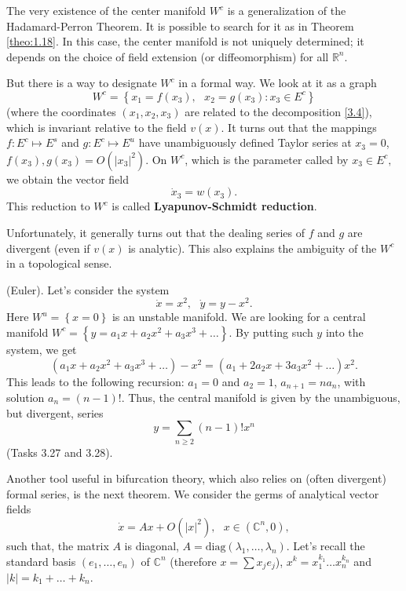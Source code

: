The very existence of the center manifold $W^{c}$ is a generalization of the Hadamard-Perron Theorem. It is possible to search for it as in Theorem \ref{theo:1.18}. In this case, the center manifold is not uniquely determined; it depends on the choice of field extension (or diffeomorphism) for all $\mathbb{R}^n$.

But there is a way to designate $W^c$ in a formal way. We look at it as a graph
$$
W^{c}=\left\{ x_{1}=f(x_{3}),\text{ \ }x_{2}=g(x_{3}):x_{3}\in E^{c}\right\}
$$
(where the coordinates $(x_1, x_2, x_3)$ are related to the decomposition \eqref{3.4}), which is invariant relative to the field $v (x)$. It turns out that the mappings $f:E^{c}\longmapsto E^{s}$ and $g:E^{c}\longmapsto E^{u}$ have unambiguously defined Taylor series at $x_3 = 0$, $f(x_{3}),g(x_{3})=O(\left\vert x_{3}\right\vert ^{2}).$ On $W^{c}$, which is the parameter called by $x_{3}\in E^{c},$ we obtain the vector field
$$
\dot{x}_{3}=w(x_{3}).
$$
This reduction to $ W ^ {c} $ is called \textbf{Lyapunov-Schmidt reduction}.

Unfortunately, it generally turns out that the dealing series of $f$ and $g$ are divergent (even if $v (x)$ is analytic). This also explains the ambiguity of the $W^c$ in a topological sense.

\begin{example} (Euler).
	Let's consider the system
	$$
	\dot{x}=x^{2},\text{ \ }\dot{y}=y-x^{2}.
	$$
	Here $ W ^ {u} = \left \{x = 0 \right \} $ is an unstable manifold. We are looking for a central manifold $W^{c}=\left\{ y= a_1 x + a_{2}x^{2}+a_{3}x^{3}+\ldots \right\} .$ By putting such $y$ into the system, we get
		$$
		\left( a_1 x +a_{2}x^{2}+a_{3}x^{3}+\ldots \right) -x^{2}=\left( a_1 +
		2a_{2}x+3a_{3}x^{2}+\ldots \right) x^{2}.
		$$
		This leads to the following recursion:  $a_1 = 0$ and $a_{2}=1$, $a_{n+1}=na_{n}$, with solution $a_{n}=(n-1)!.$ Thus, the central manifold is given by the unambiguous, but divergent, series
		$$
		y=\sum_{n\geq 2}(n-1)!x^{n}
		$$
		(Tasks 3.27 and 3.28).
\end{example}

Another tool useful in bifurcation theory, which also relies on (often divergent) formal series, is the next theorem. We consider the germs of analytical vector fields
\begin{equation}
\label{3.6}
\dot{x}=Ax+O(\left\vert x\right\vert ^{2}),\text{ \ \ }x\in \left( \mathbb{C}%
^{n},0\right) ,
\end{equation}
such that, the matrix $A$ is diagonal, $A=\textrm{diag}\left( \lambda
_{1},\ldots ,\lambda _{n}\right) .$ Let's recall the standard basis $ \left (e_ {1}, \ldots, e_ {n} \right) $ of $\mathbb{C}^{n}$ (therefore $x=\sum x_{j}e_{j}$), $x^{k}=x_{1}^{k_{1}}\ldots x_{n}^{k_{n}}$ and $\left\vert k\right\vert =k_{1}+\ldots +k_{n}.$

